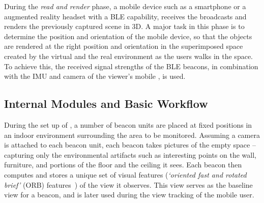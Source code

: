 During the \emph{read and render} phase, a mobile device such as a smartphone or a augmented reality headset with  a BLE capability, receives the broadcasts and renders the previously captured scene in 3D. A major task in this phase is to determine the position and orientation of the mobile device, so that the objects are rendered at the right position and orientation in the superimposed space created by the virtual and the real environment as the users walks in the space. To achieve this, the received signal strengths of the BLE beacons, in combination with the IMU and camera of the viewer's mobile , is used.






\subsection{Internal Modules and Basic Workflow}

During the set up of \Sys, a number of beacon units are placed at fixed positions in an indoor environment surrounding the area to be monitored. Assuming a camera is attached to each beacon unit, each beacon takes pictures of the empty space -- capturing only the environmental artifacts such as interesting points on the wall, furniture, and portions of the floor and the ceiling it sees. Each beacon then computes and stores a unique set of visual features (\emph{`oriented fast and rotated brief'} (ORB) features~\cite{rublee2011orb}) of the view it observes. This view serves as the baseline view for a beacon, and is later used during the view tracking of the mobile user.


